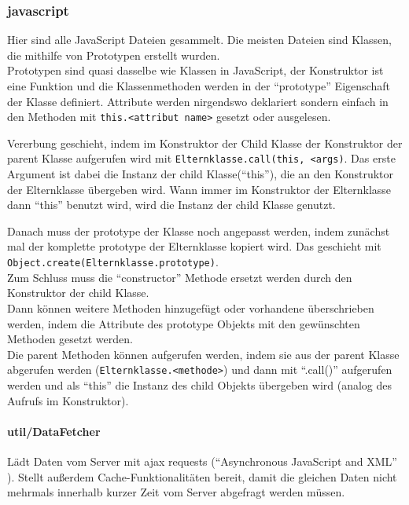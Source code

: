 \documentclass[12pt,pdftex,parskip=half]{scrartcl}
\begin{document}
        \newpage


        \subsubsection{javascript}

        Hier sind alle JavaScript Dateien gesammelt.
        Die meisten Dateien sind Klassen, die mithilfe von Prototypen erstellt wurden.\\

        Prototypen sind quasi dasselbe wie Klassen in JavaScript, der Konstruktor ist eine Funktion und die Klassenmethoden werden in der ``prototype'' Eigenschaft der Klasse definiert. Attribute werden nirgendswo deklariert sondern einfach in den Methoden mit \lstinline{this.<attribut name>} gesetzt oder ausgelesen.

        Vererbung geschieht, indem im Konstruktor der Child Klasse der Konstruktor der parent Klasse aufgerufen wird mit \lstinline{Elternklasse.call(this, <args)}.
        Das erste Argument ist dabei die Instanz der child Klasse(``this''), die an den Konstruktor der Elternklasse übergeben wird. Wann immer im Konstruktor der Elternklasse dann ``this'' benutzt wird, wird die Instanz der child Klasse genutzt.

        Danach muss der prototype der Klasse noch angepasst werden, indem zunächst mal der komplette prototype der Elternklasse kopiert wird. Das geschieht mit \lstinline{Object.create(Elternklasse.prototype)}.\\
        Zum Schluss muss die ``constructor'' Methode ersetzt werden durch den Konstruktor der child Klasse.\\
        Dann können weitere Methoden hinzugefügt oder vorhandene überschrieben werden, indem die Attribute des prototype Objekts mit den gewünschten Methoden gesetzt werden.\\
        Die parent Methoden können aufgerufen werden, indem sie aus der parent Klasse abgerufen werden (\lstinline{Elternklasse.<methode>}) und dann mit ``.call()'' aufgerufen werden und als ``this'' die Instanz des child Objekts übergeben wird (analog des Aufrufs im Konstruktor).


        \paragraph{util/DataFetcher}
        Lädt Daten vom Server mit ajax requests ("`Asynchronous JavaScript and XML"' ).
        Stellt außerdem Cache-Funktionalitäten bereit, damit die gleichen Daten nicht mehrmals innerhalb kurzer Zeit vom Server abgefragt werden müssen.
\end{document}
